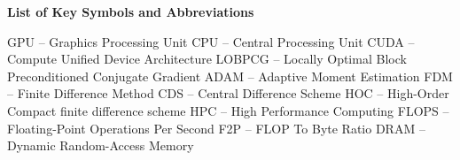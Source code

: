 \noindent
\begingroup
    \fontsize{12pt}{1.5pt}\selectfont
    \textbf{List of Key Symbols and Abbreviations}
\endgroup

\vspace{3mm}

\noindent GPU -- Graphics Processing Unit\newline
CPU -- Central Processing Unit\newline
CUDA -- Compute Unified Device Architecture\newline
LOBPCG -- Locally Optimal Block Preconditioned Conjugate Gradient\newline
ADAM -- Adaptive Moment Estimation\newline
FDM -- Finite Difference Method\newline
CDS -- Central Difference Scheme\newline
HOC -- High-Order Compact finite difference scheme\newline
HPC -- High Performance Computing\newline
FLOPS -- Floating-Point Operations Per Second\newline
F2P -- FLOP To Byte Ratio\newline
DRAM -- Dynamic Random-Access Memory



